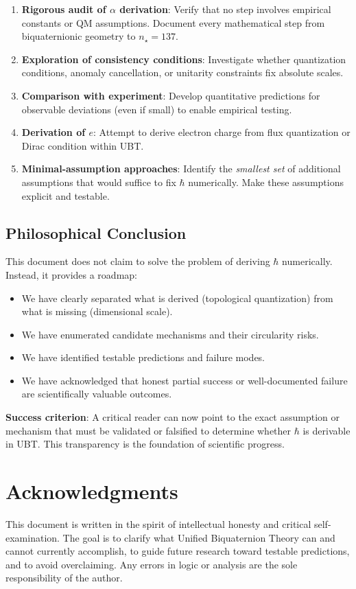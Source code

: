 \documentclass[12pt]{article}
\begin{document}
\begin{enumerate}
\item \textbf{Rigorous audit of $\alpha$ derivation}: Verify that no step involves empirical constants or QM assumptions. Document every mathematical step from biquaternionic geometry to $n_\star = 137$.

\item \textbf{Exploration of consistency conditions}: Investigate whether quantization conditions, anomaly cancellation, or unitarity constraints fix absolute scales.

\item \textbf{Comparison with experiment}: Develop quantitative predictions for observable deviations (even if small) to enable empirical testing.

\item \textbf{Derivation of $e$}: Attempt to derive electron charge from flux quantization or Dirac condition within UBT.

\item \textbf{Minimal-assumption approaches}: Identify the \emph{smallest set} of additional assumptions that would suffice to fix $\hbar$ numerically. Make these assumptions explicit and testable.
\end{enumerate}

\subsection{Philosophical Conclusion}

This document does not claim to solve the problem of deriving $\hbar$ numerically. Instead, it provides a roadmap:

\begin{itemize}
\item We have clearly separated what is derived (topological quantization) from what is missing (dimensional scale).
\item We have enumerated candidate mechanisms and their circularity risks.
\item We have identified testable predictions and failure modes.
\item We have acknowledged that honest partial success or well-documented failure are scientifically valuable outcomes.
\end{itemize}

\textbf{Success criterion}: A critical reader can now point to the exact assumption or mechanism that must be validated or falsified to determine whether $\hbar$ is derivable in UBT. This transparency is the foundation of scientific progress.

\section*{Acknowledgments}

This document is written in the spirit of intellectual honesty and critical self-examination. The goal is to clarify what Unified Biquaternion Theory can and cannot currently accomplish, to guide future research toward testable predictions, and to avoid overclaiming. Any errors in logic or analysis are the sole responsibility of the author.
\end{document}
